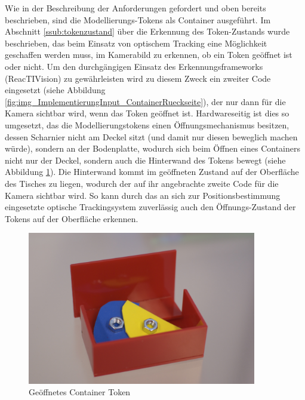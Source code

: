 Wie in der Beschreibung der Anforderungen gefordert und oben bereits beschrieben, sind die Modellierungs-Tokens als Container ausgeführt. Im Abschnitt \ref{ssub:tokenzustand} über die Erkennung des Token-Zustands wurde beschrieben, das beim Einsatz von optischem Tracking eine Möglichkeit geschaffen werden muss, im Kamerabild zu erkennen, ob ein Token geöffnet ist oder nicht. Um den durchgängigen Einsatz des Erkennungsframeworks (ReacTIVision) zu gewährleisten wird zu diesem Zweck ein zweiter Code eingesetzt (siehe Abbildung \ref{fig:img_ImplementierungInput_ContainerRueckseite}), der nur dann für die Kamera sichtbar wird, wenn das Token geöffnet ist. Hardwareseitig ist dies so umgesetzt, das die Modellierungstokens einen Öffnungsmechanismus besitzen, dessen Scharnier nicht am Deckel sitzt (und damit nur diesen beweglich machen würde), sondern an der Bodenplatte, wodurch sich beim Öffnen eines Containers nicht nur der Deckel, sondern auch die Hinterwand des Tokens bewegt (siehe Abbildung \ref{fig:img_ImplementierungInput_ContainerToken}). Die Hinterwand kommt im geöffneten Zustand auf der Oberfläche des Tisches zu liegen, wodurch der auf ihr angebrachte zweite Code für die Kamera sichtbar wird. So kann durch das an sich zur Positionsbestimmung eingesetzte optische Trackingsystem zuverlässig auch den Öffnungs-Zustand der Tokens auf der Oberfläche erkennen.

\begin{figure}[htbp]
	\centering
		\includegraphics[width=10cm]{img/ImplementierungInput/ContainerToken.jpg}
	\caption{Geöffnetes Container Token}
	\label{fig:img_ImplementierungInput_ContainerToken}
\end{figure}

